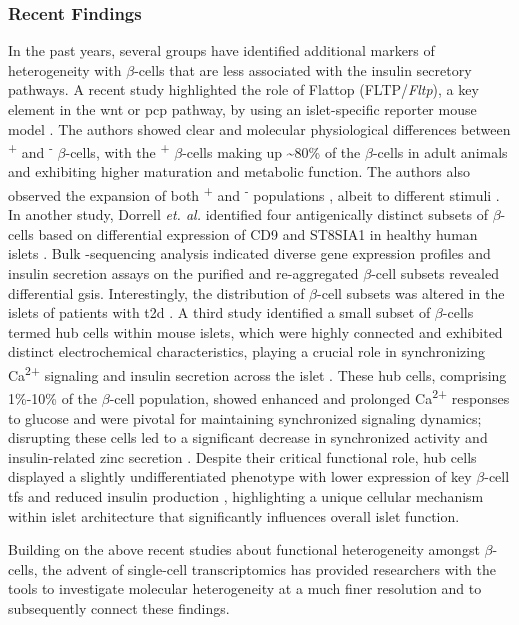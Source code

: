 \subsubsection{Recent Findings}
In the past years, several groups have identified additional markers of heterogeneity with $\beta$-cells that are less associated with the insulin secretory pathways. A recent study highlighted the role of Flattop (FLTP/\textit{Fltp}), a key element in the \gls{wnt} or \gls{pcp} pathway, by using an islet-specific  reporter mouse model \textbf{\cite{bader_identification_2016,roscioni_impact_2016}}. The authors showed clear and molecular physiological differences between \textsuperscript{+} and \textsuperscript{-} $\beta$-cells, with the \textsuperscript{+} $\beta$-cells making up \textasciitilde80\% of the $\beta$-cells in adult animals and exhibiting higher maturation and metabolic function. The authors also observed the expansion of both \textsuperscript{+} and \textsuperscript{-} populations , albeit to different stimuli \textbf{\cite{bader_identification_2016}}. In another study, Dorrell \textit{et. al.} identified four antigenically distinct subsets of $\beta$-cells based on differential expression of CD9 and ST8SIA1 in healthy human islets \textbf{\cite{dorrell_human_2016}}. Bulk -sequencing analysis indicated diverse gene expression profiles and insulin secretion assays on the purified and re-aggregated $\beta$-cell subsets revealed differential \gls{gsis}. Interestingly, the distribution of $\beta$-cell subsets was altered in the islets of patients with \gls{t2d} \textbf{\cite{dorrell_human_2016}}. A third study identified a small subset of $\beta$-cells termed hub cells within mouse islets, which were highly connected and exhibited distinct electrochemical characteristics, playing a crucial role in synchronizing Ca\textsuperscript{2+} signaling and insulin secretion across the islet \textbf{\cite{johnston_beta_2016}}. These hub cells, comprising 1\%-10\% of the $\beta$-cell population, showed enhanced and prolonged Ca\textsuperscript{2+} responses to glucose and were pivotal for maintaining synchronized signaling dynamics; disrupting these cells led to a significant decrease in synchronized activity and insulin-related zinc secretion \textbf{\cite{johnston_beta_2016}}. Despite their critical functional role, hub cells displayed a slightly undifferentiated phenotype with lower expression of key $\beta$-cell \glspl{tf} and reduced insulin production \textbf{\cite{johnston_beta_2016}}, highlighting a unique cellular mechanism within islet architecture that significantly influences overall islet function.\\
\par Building on the above recent studies about functional heterogeneity amongst $\beta$-cells, the advent of single-cell transcriptomics has provided researchers with the tools to investigate molecular heterogeneity at a much finer resolution and to subsequently connect these findings.


